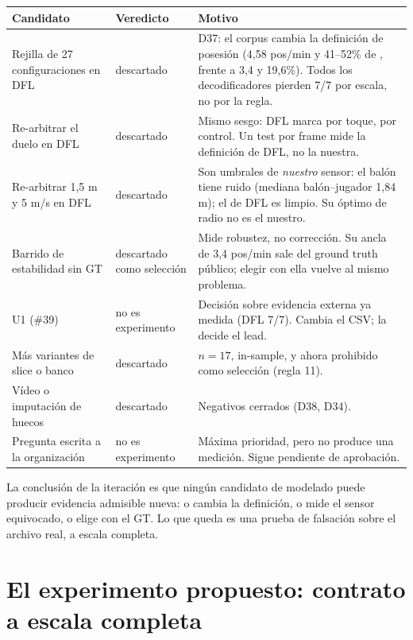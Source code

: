 \documentclass[11pt,a4paper]{article}
\newcommand{\code}[1]{\texttt{\detokenize{#1}}}
\begin{document}
\begin{table}[h]
\centering
\small
\begin{tabular}{@{}p{4.6cm}p{1.6cm}p{7.4cm}@{}}
\toprule
Candidato & Veredicto & Motivo \\
\midrule
Rejilla de 27 configuraciones en DFL & descartado &
D37: el corpus cambia la definici\'on de posesi\'on (4,58 pos/min y 41--52\% de \code{D}, frente a
3,4 y 19,6\%). Todos los decodificadores pierden 7/7 por escala, no por la regla. \\
Re-arbitrar el duelo en DFL & descartado &
Mismo sesgo: DFL marca por toque, \code{CHALLENGE.md} por control. Un test por frame mide la
definici\'on de DFL, no la nuestra. \\
Re-arbitrar 1,5 m y 5 m/s en DFL & descartado &
Son umbrales de \emph{nuestro} sensor: el bal\'on tiene ruido (mediana bal\'on--jugador 1,84 m); el
de DFL es limpio. Su \'optimo de radio no es el nuestro. \\
Barrido de estabilidad sin GT & descartado como selecci\'on &
Mide robustez, no correcci\'on. Su ancla de 3,4 pos/min sale del ground truth p\'ublico; elegir con
ella vuelve al mismo problema. \\
U1 \code{onset} (\#39) & no es experimento &
Decisi\'on sobre evidencia externa ya medida (DFL 7/7). Cambia el CSV; la decide el lead. \\
M\'as variantes de slice o banco & descartado &
$n=17$, in-sample, y ahora prohibido como selecci\'on (regla 11). \\
V\'ideo o imputaci\'on de huecos & descartado &
Negativos cerrados (D38, D34). \\
Pregunta escrita a la organizaci\'on & no es experimento &
M\'axima prioridad, pero no produce una medici\'on. Sigue pendiente de aprobaci\'on. \\
\bottomrule
\end{tabular}
\end{table}

La conclusi\'on de la iteraci\'on es que ning\'un candidato de modelado puede producir evidencia
admisible nueva: o cambia la definici\'on, o mide el sensor equivocado, o elige con el GT. Lo que
queda es una prueba de falsaci\'on sobre el archivo real, a escala completa.

\section{El experimento propuesto: contrato a escala completa}
\end{document}
